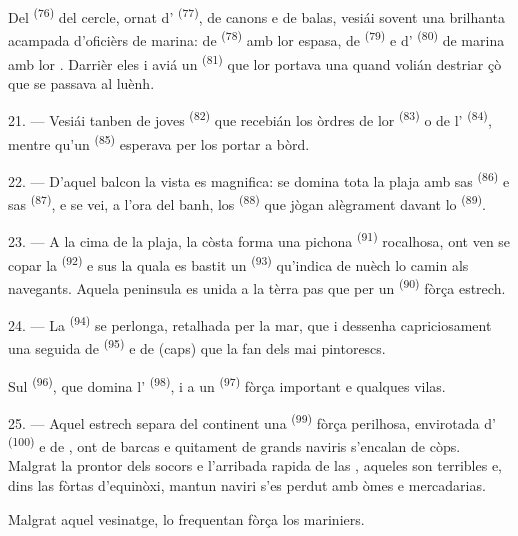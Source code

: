 Del  \textsuperscript{(76)} del cercle, ornat d'
\textsuperscript{(77)}, de canons e de balas, vesiái sovent una brilhanta
acampada d'oficièrs de marina: de 
\textsuperscript{(78)} amb lor espasa, de 
\textsuperscript{(79)} e d' \textsuperscript{(80)} de marina
amb lor . Darrièr eles i aviá un 
\textsuperscript{(81)} que lor portava una  quand volián destriar
çò que se passava al luènh.

21. --- Vesiái tanben de joves 
\textsuperscript{(82)} que recebián los òrdres de lor 
\textsuperscript{(83)} o de l' \textsuperscript{(84)}, mentre
qu'un  \textsuperscript{(85)} esperava per los portar a bòrd.

22. --- D'aquel balcon la vista es magnifica: se domina tota la plaja amb sas
 \textsuperscript{(86)} e sas 
\textsuperscript{(87)}, e se vei, a l'ora del banh, los 
\textsuperscript{(88)} que jògan alègrament davant lo 
\textsuperscript{(89)}.

23. --- A la cima de la plaja, la còsta forma una pichona 
\textsuperscript{(91)} rocalhosa, ont ven se copar la 
\textsuperscript{(92)} e sus la quala es bastit un 
\textsuperscript{(93)} qu'indica de nuèch lo camin als navegants. Aquela peninsula
es unida a la tèrra pas que per un  \textsuperscript{(90)} fòrça
estrech.

\VUsaut{3.0mm}
\VUsaut{3.0mm}

24. --- La  \textsuperscript{(94)} se perlonga, retalhada per
la mar, que i dessenha capriciosament una seguida de 
\textsuperscript{(95)} e de  (caps) que la fan dels mai
pintorescs.

Sul  \textsuperscript{(96)}, que domina l'
\textsuperscript{(98)}, i a un  \textsuperscript{(97)} fòrça
important e qualques vilas.

25. --- Aquel estrech separa del continent una 
\textsuperscript{(99)} fòrça perilhosa, envirotada d'
\textsuperscript{(100)} e de , ont de barcas e quitament de
grands naviris s'encalan de còps. Malgrat la prontor dels socors e l'arribada
rapida de las , aqueles  son
terribles e, dins las fòrtas  d'equinòxi, mantun naviri s'es
perdut amb òmes e mercadarias.

Malgrat aquel vesinatge,  lo frequentan fòrça los mariniers.
\VUsaut{6.0mm}
\VUfilet{22mm}
